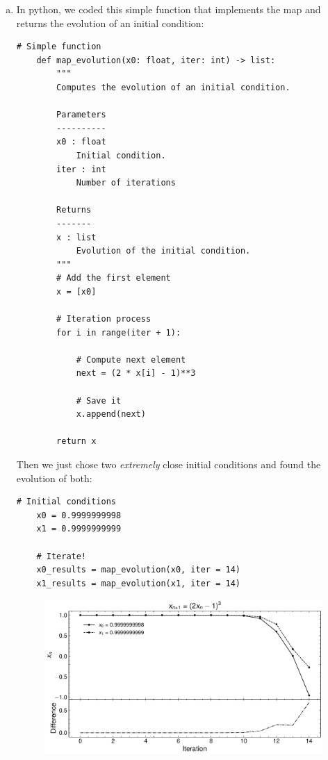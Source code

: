 \begin{enumerate}[(a)]
    \item In python, we coded this simple function that implements
    the map and returns the evolution of an initial condition:
    \begin{lstlisting}[style=pythonstyle]
    # Simple function
    def map_evolution(x0: float, iter: int) -> list:
        """
        Computes the evolution of an initial condition.

        Parameters
        ----------
        x0 : float
            Initial condition.
        iter : int
            Number of iterations

        Returns
        -------
        x : list
            Evolution of the initial condition.
        """
        # Add the first element
        x = [x0]

        # Iteration process
        for i in range(iter + 1):
            
            # Compute next element
            next = (2 * x[i] - 1)**3

            # Save it
            x.append(next)

        return x
    \end{lstlisting}

    Then we just chose two \textit{extremely} close initial conditions
    and found the evolution of both:
    \begin{lstlisting}[style=pythonstyle]
    # Initial conditions
    x0 = 0.9999999998
    x1 = 0.9999999999

    # Iterate!
    x0_results = map_evolution(x0, iter = 14)
    x1_results = map_evolution(x1, iter = 14)
    \end{lstlisting}

    \begin{figure}[!ht]
        \centering
        \includegraphics[scale=0.7]{images/4a.pdf}
        \label{fig:4a}
    \end{figure}


\end{enumerate}
